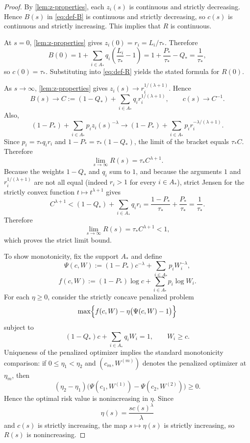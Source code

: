 \documentclass[11pt]{article}
\theoremstyle{definition}
\theoremstyle{remark}
\newcommand{\1}{\mathbf{1}}
\begin{document}
\begin{proof}
By \cref{lem:z-properties}, each $z_i(s)$ is continuous and strictly decreasing. Hence $B(s)$ in \eqref{eq:def-B} is continuous and strictly decreasing, so $c(s)$ is continuous and strictly increasing. This implies that $R$ is continuous.

At $s=0$, \cref{lem:z-properties} gives $z_i(0)=r_i=L_i/\tau_*$. Therefore
\[
B(0)=1+\sum_{i\in A_*}q_i\left(\frac{L_i}{\tau_*}-1\right)
=1+\frac{P_*}{\tau_*}-Q_*
=\frac{1}{\tau_*},
\]
so $c(0)=\tau_*$. Substituting into \eqref{eq:def-R} yields the stated formula for $R(0)$.

As $s\to\infty$, \cref{lem:z-properties} gives $z_i(s)\to r_i^{1/(\lambda+1)}$. Hence
\[
B(s)\to C:=(1-Q_*)+\sum_{i\in A_*} q_i r_i^{1/(\lambda+1)},
\qquad
c(s)\to C^{-1}.
\]
Also,
\[
(1-P_*)+\sum_{i\in A_*}p_i z_i(s)^{-\lambda}
\to
(1-P_*)+\sum_{i\in A_*} p_i r_i^{-\lambda/(\lambda+1)}.
\]
Since $p_i=\tau_* q_i r_i$ and $1-P_*=\tau_*(1-Q_*)$, the limit of the bracket equals $\tau_* C$. Therefore
\[
\lim_{s\to\infty}R(s)=\tau_* C^{\lambda+1}.
\]
Because the weights $1-Q_*$ and $q_i$ sum to $1$, and because the arguments $1$ and $r_i^{1/(\lambda+1)}$ are not all equal (indeed $r_i>1$ for every $i\in A_*$), strict Jensen for the strictly convex function $t\mapsto t^{\lambda+1}$ gives
\[
C^{\lambda+1}
< (1-Q_*)+\sum_{i\in A_*}q_i r_i
=\frac{1-P_*}{\tau_*}+\frac{P_*}{\tau_*}
=\frac{1}{\tau_*}.
\]
Therefore
\[
\lim_{s\to\infty}R(s)=\tau_* C^{\lambda+1}<1,
\]
which proves the strict limit bound.

To show monotonicity, fix the support $A_*$ and define
\[
\Psi(c,W):=(1-P_*)c^{-\lambda}+\sum_{i\in A_*}p_iW_i^{-\lambda},
\]
\[
f(c,W):=(1-P_*)\log c+\sum_{i\in A_*}p_i\log W_i.
\]
For each $\eta\ge 0$, consider the strictly concave penalized problem
\[
\max\Bigl\{f(c,W)-\eta\bigl(\Psi(c,W)-1\bigr)\Bigr\}
\]
subject to
\[
(1-Q_*)c+\sum_{i\in A_*}q_iW_i=1,
\qquad
W_i\ge c.
\]
Uniqueness of the penalized optimizer implies the standard monotonicity comparison: if $0\le \eta_1<\eta_2$ and $(c_m,W^{(m)})$ denotes the penalized optimizer at $\eta_m$, then
\[
(\eta_2-\eta_1)\bigl(\Psi(c_1,W^{(1)})-\Psi(c_2,W^{(2)})\bigr)\ge 0.
\]
Hence the optimal risk value is nonincreasing in $\eta$. Since
\[
\eta(s)=\frac{s c(s)^\lambda}{\lambda}
\]
and $c(s)$ is strictly increasing, the map $s\mapsto\eta(s)$ is strictly increasing, so $R(s)$ is nonincreasing.


\end{proof}
\end{document}
